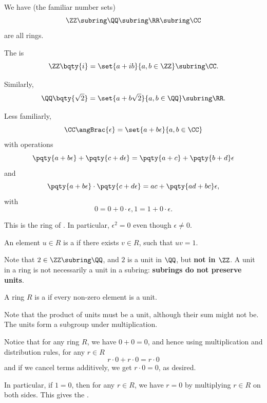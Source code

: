 \begin{example}
    \label{ex:rings}%
    We have (the familiar number sets)
    \[
        \ZZ \subring \QQ \subring \RR \subring \CC
    \]
    are all rings.

    The  is
    \[
        \ZZ \bqty{i} = \set{a + ib}{a, b \in \ZZ} \subring \CC.
    \]

    Similarly,
    \[
        \QQ \bqty{\sqrt{2}} = \set{a + b \sqrt{2}}{a, b \in \QQ} \subring \RR.
    \]

    Less familiarly,
    \[
        \CC \angBrac{\epsilon} = \set{a + b\epsilon}{a, b \in \CC}
    \]
    with operations
    \[
        \pqty{a + b\epsilon} + \pqty{c + d\epsilon} = \pqty{a + c} + \pqty{b + d}\epsilon
    \]
    and
    \[
        \pqty{a + b\epsilon} \cdot \pqty{c + d\epsilon} = ac + \pqty{ad + bc} \epsilon,
    \]
    with
    \[
        0 = 0 + 0 \cdot \epsilon, 1 = 1 + 0 \cdot \epsilon.
    \]

    This is the ring of . In particular, \(\epsilon^2 = 0\) even though \(\epsilon \neq 0\).
\end{example}

\begin{definition}[Unit]
    \label{def:unit}%
    An element \(u \in R\) is a  if there exists \(v \in R\), such that \(uv = 1\).
\end{definition}

\begin{remark}
    Note that \(2 \in \ZZ \subring \QQ\), and \(2\) is a unit in \(\QQ\), but \textbf{not in \(\ZZ\)}. A unit in a ring is not necessarily a unit in a subring: \textbf{subrings do not preserve units}.
\end{remark}

\begin{definition}[Field]
    \label{def:field}%
    A ring \(R\) is a  if every non-zero element is a unit.
\end{definition}

Note that the product of units must be a unit, although their sum might not be. The units form a subgroup under multiplication.

Notice that for any ring \(R\), we have \(0 + 0 = 0\), and hence using multiplication and distribution rules, for any \(r \in R\)
\[
    r \cdot 0 + r \cdot 0 = r \cdot 0
\]
and if we cancel terms additively, we get \(r \cdot 0 = 0\), as desired.

In particular, if \(1 = 0\), then for any \(r \in R\), we have \(r = 0\) by multiplying \(r \in R\) on both sides. This gives the .

